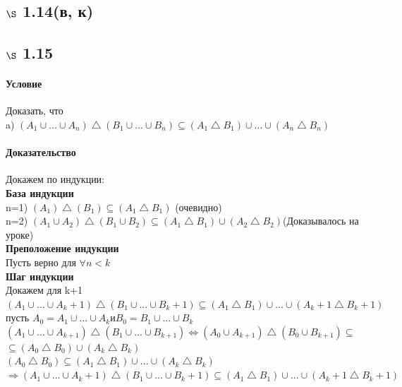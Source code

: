 \documentclass[a4paper,12pt]{article}
\begin{document}
\subsection*{$\S$ 1.14(в, к)}

\subsection*{$\S$ 1.15}
\paragraph*{Условие}
Доказать, что\\
a) $(A_1 \cup ... \cup A_n) \bigtriangleup (B_1 \cup ... \cup B_n) \subseteq (A_1 \bigtriangleup B_1) \cup ... \cup (A_n \bigtriangleup B_n) $
\paragraph*{Доказательство}
Докажем по индукции:\\
\textbf{База индукции}\\
 n=1)  $(A_1) \bigtriangleup (B_1) \subseteq (A_1 \bigtriangleup B_1) $ (очевидно)\\
 n=2)  $(A_1 \cup  A_2) \bigtriangleup (B_1 \cup B_2) \subseteq (A_1 \bigtriangleup B_1) \cup (A_2 \bigtriangleup B_2) $(Доказывалось на уроке)\\
 \textbf{Преположение индукции}\\
 Пусть верно для $\forall n < k$\\
 \textbf{Шаг индукции}\\
 Докажем для k+1\\
 $(A_1 \cup ... \cup A_k+1) \bigtriangleup (B_1 \cup ... \cup B_k+1) \subseteq (A_1 \bigtriangleup B_1) \cup ... \cup (A_k+1 \bigtriangleup B_k+1) $\\
 пусть $ A_0 = A_1 \cup ... \cup A_k и B_0 = B_1 \cup ... \cup B_k$\\
 $(A_1 \cup ... \cup A_{k+1}) \bigtriangleup (B_1 \cup ... \cup B_{k+1}) \Leftrightarrow (A_0 \cup A_{k+1}) \bigtriangleup (B_0 \cup B_{k+1}) \subseteq $ \\
$ \subseteq (A_0 \bigtriangleup B_0) \cup (A_k \bigtriangleup B_k)$\\
$(A_0 \bigtriangleup B_0) \subseteq  (A_1 \bigtriangleup B_1) \cup ... \cup (A_k \bigtriangleup B_k)$\\
$\Rightarrow (A_1 \cup ... \cup A_k+1) \bigtriangleup (B_1 \cup ... \cup B_k+1) \subseteq (A_1 \bigtriangleup B_1) \cup ... \cup (A_k+1 \bigtriangleup B_k+1) $
\end{document}
